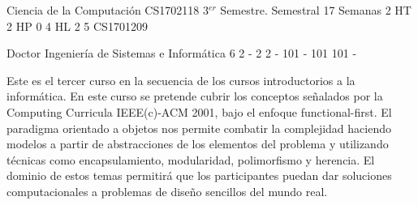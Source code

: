 \documentclass[a4paper,8pt]{article}
\begin{document}
\setNombreProfesor{}
\setGradoProfesorAbreviado{}
\sylabusHeader

\academicaTable
{Ciencia de la Computación} %
{CS1702118} %
{3$^{er}$ Semestre.} %
{Semestral} %
{17 Semanas} %
{2 HT} %
{2 HP} %
{0} %
{4 HL}  %
{2} %
{5} %
{CS1701209} %

\administrativaTable
{Doctor} %
{Ingeniería de Sistemas e Informática} %
{6} %
{2} %
{-} %
{2} %
{2} %
{-} %
{101} %
{-} %
{101} %
{101} %
{-} %


\begin{fundamentacion}
Este es el tercer curso en la secuencia de los cursos introductorios a la informática. En este curso se pretende cubrir los
conceptos señalados por la Computing Curricula IEEE(c)-ACM 2001, bajo el enfoque functional-first.
El paradigma orientado a objetos nos permite combatir la complejidad haciendo modelos a partir de abstracciones
de los elementos del problema y utilizando técnicas como encapsulamiento, modularidad, polimorfismo y herencia. El
dominio de estos temas permitirá que los participantes puedan dar soluciones computacionales a problemas de diseño
sencillos del mundo real.

\end{fundamentacion}

\begin{sumilla}
\item \SDFFundamentalProgrammingConcepts
\item \SDFAlgorithmsandDesign
\item \PLEventDrivenandReactiveProgramming
\item \ALBasicAnalysis
\item \ALFundamentalDataStructuresandAlgorithms
\item \PLBasicTypeSystems
\item \PLObjectOrientedProgramming
\item \DSGraphsandTrees
\item \SESoftwareDesign
\item \SERequirementsEngineering

\end{sumilla}
\end{document}
